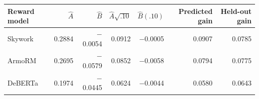 \begin{tabular}{lrrrrrr}
\toprule
Reward model & $\widehat A$ & $\widehat B$ & $\widehat A\sqrt{.10}$ & $\widehat B(.10)$ & Predicted gain & Held-out gain \\
\midrule
Skywork & 0.2884 & $-$0.0054 & 0.0912 & $-$0.0005 & 0.0907 & 0.0785 \\
ArmoRM & 0.2695 & $-$0.0579 & 0.0852 & $-$0.0058 & 0.0794 & 0.0775 \\
DeBERTa & 0.1974 & $-$0.0445 & 0.0624 & $-$0.0044 & 0.0580 & 0.0643 \\
\bottomrule
\end{tabular}

